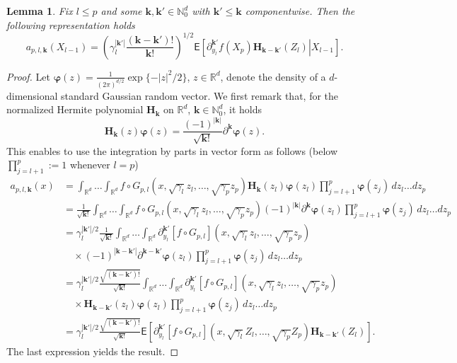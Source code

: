 \documentclass[article]{elsarticle}
\newtheorem{lem}[thm]{Lemma}
\begin{document}
\begin{lem}\label{eq:a_repr}
Fix $l\le p$ and some \(\mathbf{k},\mathbf{k}'\in \mathbb{N}_0^d\) with \(\mathbf{k}'\le \mathbf{k}\) componentwise.  Then the following representation holds
$$
a_{p,l,\mathbf{k}}(X_{l-1})=\left(\gamma_{l}^{|\mathbf{k}'|}\frac{(\mathbf{k}-\mathbf{k}') !}{\mathbf{k}!}\right)^{1/2}
\mathsf E\left[\left.
\partial_{y_l}^{\mathbf{k}'}f(X_p)\mathbf{H}_{\mathbf{k}-\mathbf{k}'}(Z_l)\right|X_{l-1}\right].
$$
\end{lem}

\begin{proof}
Let $\boldsymbol{\varphi}(z)=\frac{1}{(2\pi)^{d/2}} \exp\{-|z|^2/2\}$,
$z\in\mathbb R^d$, denote the density of a $d$-dimensional
standard Gaussian random vector.
We first remark that, for the normalized Hermite polynomial $\mathbf H_{\mathbf k}$ on $\mathbb R^d$,
$\mathbf k\in\mathbb N_0^d$, it holds
$$
\mathbf{H}_{\mathbf{k}}(z)\boldsymbol{\varphi}(z)
=\frac{(-1)^{|\mathbf{k}|}}{\sqrt{\mathbf{k} !}} \partial^{\mathbf{k}} \boldsymbol{\varphi}(z).
$$
This enables to use the integration by parts in vector form as follows
(below $\prod_{j=l+1}^p:=1$ whenever $l=p$)
\begin{align*}
a_{p,l,\mathbf k}(x)
& =
\int_{\mathbb R^d}\ldots\int_{\mathbb R^d}
f\circ G_{p,l}(x,\sqrt{\gamma_{l}}z_{l},\ldots,\sqrt{\gamma_{p}}z_{p})
\mathbf{H}_{\mathbf{k}}(z_{l})\boldsymbol{\varphi}(z_l)
\prod_{j=l+1}^p\boldsymbol{\varphi}(z_j)\, dz_{l}\ldots dz_{p}
\\
& =
\frac{1}{\sqrt{\mathbf k!}}
\int_{\mathbb R^d}\ldots\int_{\mathbb R^d}
f\circ G_{p,l}(x,\sqrt{\gamma_{l}}z_{l},\ldots,\sqrt{\gamma_{p}}z_{p})
(-1)^{|\mathbf{k}|}\partial^{\mathbf{k}} \boldsymbol{\varphi}(z_l)
\prod_{j=l+1}^p\boldsymbol{\varphi}(z_j)\, dz_{l}\ldots dz_{p}
\\
& =
\gamma_l^{|\mathbf k'|/2}\frac{1}{\sqrt{\mathbf k!}}
\int_{\mathbb R^d}\ldots\int_{\mathbb R^d}
\partial_{y_l}^{\mathbf k'}[f\circ G_{p,l}](x,\sqrt{\gamma_{l}}z_{l},\ldots,\sqrt{\gamma_{p}}z_{p})
\\
&\hspace{1em}\times
(-1)^{|\mathbf{k}-\mathbf k'|}\partial^{\mathbf{k}-\mathbf k'} \boldsymbol{\varphi}(z_l)
\prod_{j=l+1}^p\boldsymbol{\varphi}(z_j)\, dz_{l}\ldots dz_{p}
\\
& =
\gamma_l^{|\mathbf k'|/2}\frac{\sqrt{(\mathbf k-\mathbf k')!}}{\sqrt{\mathbf k!}}
\int_{\mathbb R^d}\ldots\int_{\mathbb R^d}
\partial_{y_l}^{\mathbf k'}[f\circ G_{p,l}](x,\sqrt{\gamma_{l}}z_{l},\ldots,\sqrt{\gamma_{p}}z_{p})
\\
&\hspace{1em}\times
\mathbf{H}_{\mathbf{k}-\mathbf k'}(z_{l})\boldsymbol{\varphi}(z_l)
\prod_{j=l+1}^p\boldsymbol{\varphi}(z_j)\, dz_{l}\ldots dz_{p}
\\
 & =\gamma_{l}^{|\mathbf{k}'|/2}\frac{\sqrt{(\mathbf{k}-\mathbf{k}')!}}{\sqrt{\mathbf{k}!}}\mathsf{E}\left[\partial_{y_{l}}^{\mathbf{k}'}[f\circ G_{p,l}](x,\sqrt{\gamma_{l}}Z_{l},\ldots,\sqrt{\gamma_{p}}Z_{p})\mathbf{H}_{\mathbf{k}-\mathbf{k}'}(Z_{l})\right].
\end{align*}
The last expression yields the result.
\end{proof}
\end{document}

